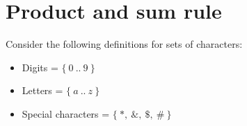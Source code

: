 \documentclass[]{exam}
\begin{document}
  \begin{center}
  \end{center}

  \section*{Product and sum rule}

  Consider the following definitions for sets of characters:

  \begin{itemize}
    \item Digits = $\{\ 0\ ..\ 9\ \}$
    \item Letters = $\{\ a\ ..\ z\ \}$
    \item Special characters = $\{\ *,\ \&,\ \$,\ \#\ \}$
  \end{itemize}
\end{document}
